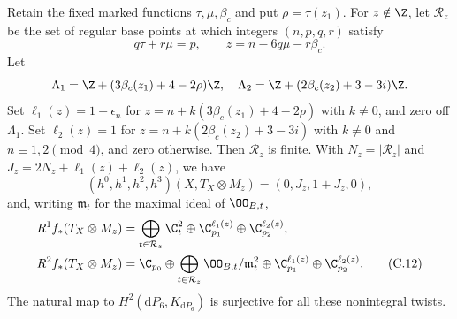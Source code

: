 
\begin{proposition}\label{cdp:st:C5c}
Retain the fixed marked functions $\tau,\mu,\beta_c$ and put $\rho=\tau(z_1)$. For $z\notin\Z$, let $\mathcal R_z$ be the set of regular base points at which integers $(n,p,q,r)$ satisfy
\[
 q\tau+r\mu=p,\qquad z=n-6q\mu-r\beta_c.               \tag{C.10}\label{cdp:eq:C.10}
\]
Let
\[
 \Lambda_1=\Z+(3\beta_c(z_1)+4-2\rho)\Z,\quad
 \Lambda_2=\Z+(2\beta_c(z_2)+3-3i)\Z.
\]
Set $\ell_1(z)=1+\epsilon_n$ for $z=n+k(3\beta_c(z_1)+4-2\rho)$ with $k\ne0$, and zero off $\Lambda_1$. Set $\ell_2(z)=1$ for $z=n+k(2\beta_c(z_2)+3-3i)$ with $k\ne0$ and $n\equiv1,2\pmod4$, and zero otherwise. Then $\mathcal R_z$ is finite. With $N_z=|\mathcal R_z|$ and $J_z=2N_z+\ell_1(z)+\ell_2(z)$, we have
\[
 (h^0,h^1,h^2,h^3)(X,T_X\otimes M_z)=(0,J_z,1+J_z,0),  \tag{C.11}\label{cdp:eq:C.11}
\]
and, writing $\mathfrak m_t$ for the maximal ideal of $\OO_{B,t}$,
\begin{align*}
R^1f_*(T_X\otimes M_z)&=
 \bigoplus_{t\in\mathcal R_z}\C_t^2
 \oplus\C_{p_1}^{\ell_1(z)}\oplus\C_{p_2}^{\ell_2(z)},\\
R^2f_*(T_X\otimes M_z)&=
 \C_{p_0}\oplus\bigoplus_{t\in\mathcal R_z}\OO_{B,t}/\mathfrak m_t^2
 \oplus\C_{p_1}^{\ell_1(z)}\oplus\C_{p_2}^{\ell_2(z)}.\tag{C.12}\label{cdp:eq:C.12}
\end{align*}
The natural map to $H^2(\mathrm dP_6,K_{\mathrm dP_6})$ is surjective for all these nonintegral twists.
\end{proposition}

